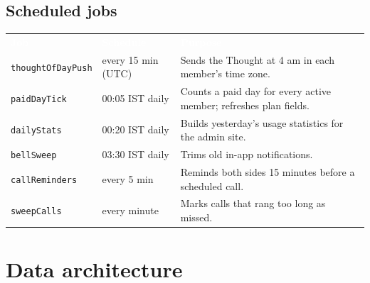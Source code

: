 \documentclass[11pt,a4paper,oneside]{report}
\newcommand{\thead}[1]{\textcolor{white}{\bfseries #1}}
\newcommand{\headrow}{\rowcolor{ojDeep}}
\begin{document}
\section{Scheduled jobs}
\begin{tabularx}{\textwidth}{@{}p{3.4cm}p{3.6cm}L@{}}
\headrow \thead{Job} & \thead{Schedule} & \thead{Purpose} \\
\texttt{thoughtOfDayPush} & every 15 min (UTC) & Sends the Thought at 4 am in each member's time zone. \\
\texttt{paidDayTick} & 00:05 IST daily & Counts a paid day for every active member; refreshes plan fields. \\
\texttt{dailyStats} & 00:20 IST daily & Builds yesterday's usage statistics for the admin site. \\
\texttt{bellSweep} & 03:30 IST daily & Trims old in-app notifications. \\
\texttt{callReminders} & every 5 min & Reminds both sides 15 minutes before a scheduled call. \\
\texttt{sweepCalls} & every minute & Marks calls that rang too long as missed. \\
\bottomrule
\end{tabularx}

\chapter{Data architecture}
\end{document}
